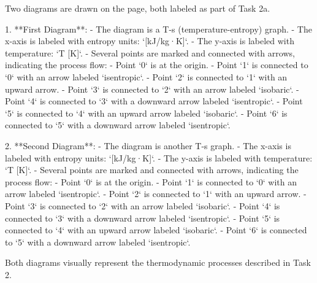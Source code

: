 Two diagrams are drawn on the page, both labeled as part of Task 2a.  

1. **First Diagram**:  
   - The diagram is a T-s (temperature-entropy) graph.  
   - The x-axis is labeled with entropy units: `[kJ/kg·K]`.  
   - The y-axis is labeled with temperature: `T [K]`.  
   - Several points are marked and connected with arrows, indicating the process flow:  
     - Point `0` is at the origin.  
     - Point `1` is connected to `0` with an arrow labeled `isentropic`.  
     - Point `2` is connected to `1` with an upward arrow.  
     - Point `3` is connected to `2` with an arrow labeled `isobaric`.  
     - Point `4` is connected to `3` with a downward arrow labeled `isentropic`.  
     - Point `5` is connected to `4` with an upward arrow labeled `isobaric`.  
     - Point `6` is connected to `5` with a downward arrow labeled `isentropic`.  

2. **Second Diagram**:  
   - The diagram is another T-s graph.  
   - The x-axis is labeled with entropy units: `[kJ/kg·K]`.  
   - The y-axis is labeled with temperature: `T [K]`.  
   - Several points are marked and connected with arrows, indicating the process flow:  
     - Point `0` is at the origin.  
     - Point `1` is connected to `0` with an arrow labeled `isentropic`.  
     - Point `2` is connected to `1` with an upward arrow.  
     - Point `3` is connected to `2` with an arrow labeled `isobaric`.  
     - Point `4` is connected to `3` with a downward arrow labeled `isentropic`.  
     - Point `5` is connected to `4` with an upward arrow labeled `isobaric`.  
     - Point `6` is connected to `5` with a downward arrow labeled `isentropic`.  

Both diagrams visually represent the thermodynamic processes described in Task 2.
